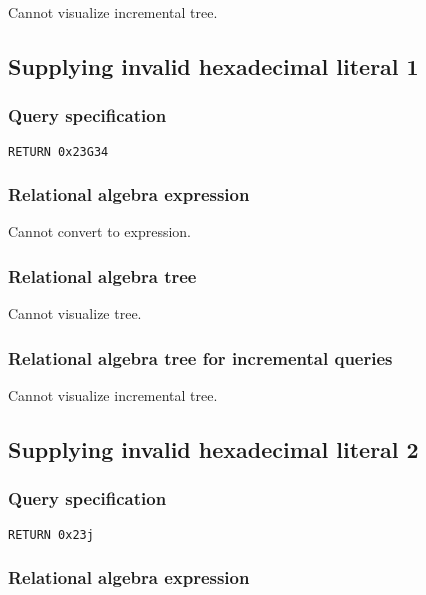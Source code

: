 Cannot visualize incremental tree.

\subsection{Supplying invalid hexadecimal literal 1}

\subsubsection*{Query specification}

\begin{lstlisting}
RETURN 0x23G34
\end{lstlisting}

\subsubsection*{Relational algebra expression}

Cannot convert to expression.

\subsubsection*{Relational algebra tree}

Cannot visualize tree.

\subsubsection*{Relational algebra tree for incremental queries}

Cannot visualize incremental tree.

\subsection{Supplying invalid hexadecimal literal 2}

\subsubsection*{Query specification}

\begin{lstlisting}
RETURN 0x23j
\end{lstlisting}

\subsubsection*{Relational algebra expression}

